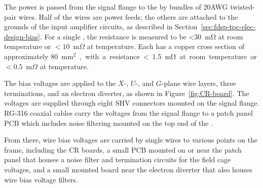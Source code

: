The  power is passed from the signal flange to the  by bundles of
20AWG twisted-pair wires. Half of the wires are power feeds; the others
are attached to the grounds of the input amplifier circuits, as described in Section~\ref{sec:fdsp-tpc-elec-design-bias}.
For a single , the resistance is measured to be  <\SI{30}{\milli\ohm} at room temperature or $<10$~m$\Omega$ at 
\lar temperature. Each  has a copper cross section of approximately %
\SI{80}{mm$^2$}, with a 
resistance <\SI{1.5}{\milli\ohm} at room temperature or $<0.5$~m$\Omega$ at \lar temperature.

The bias voltages are applied to the $X$-, $U$-, and $G$-plane wire layers, three  terminations, 
and an electron diverter, as shown in Figure~\ref{fig:CR-board}. The voltages are supplied 
through eight SHV connectors mounted on the signal flange. RG-316 coaxial cables carry the voltages 
from the signal flange to a patch panel PCB which includes noise filtering mounted on the top 
end of the . 

From there, wire bias voltages are carried by single wires to 
various points on the  frame, including the CR boards, a small PCB mounted on or near 
the patch panel that houses a noise filter and termination circuits for the field cage voltages, and 
a small mounted board near the electron diverter that also houses wire bias voltage filters.
